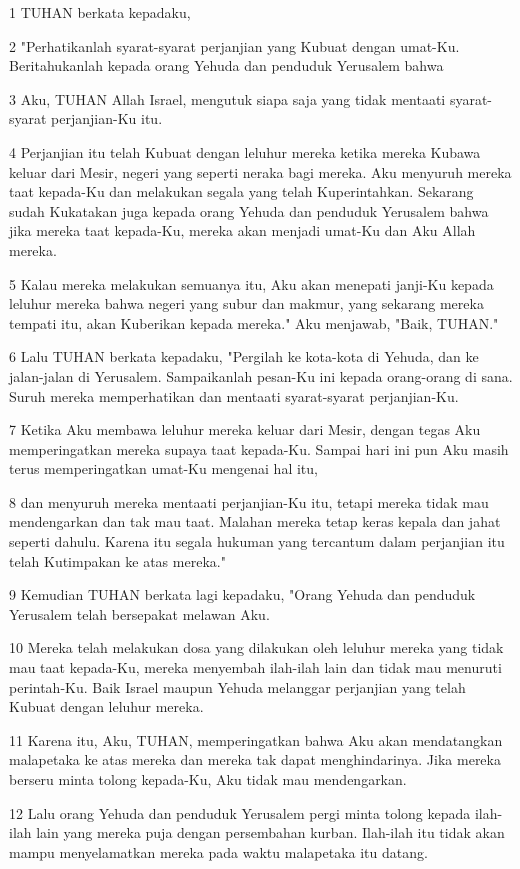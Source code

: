 \par 1 TUHAN berkata kepadaku,
\par 2 "Perhatikanlah syarat-syarat perjanjian yang Kubuat dengan umat-Ku. Beritahukanlah kepada orang Yehuda dan penduduk Yerusalem bahwa
\par 3 Aku, TUHAN Allah Israel, mengutuk siapa saja yang tidak mentaati syarat-syarat perjanjian-Ku itu.
\par 4 Perjanjian itu telah Kubuat dengan leluhur mereka ketika mereka Kubawa keluar dari Mesir, negeri yang seperti neraka bagi mereka. Aku menyuruh mereka taat kepada-Ku dan melakukan segala yang telah Kuperintahkan. Sekarang sudah Kukatakan juga kepada orang Yehuda dan penduduk Yerusalem bahwa jika mereka taat kepada-Ku, mereka akan menjadi umat-Ku dan Aku Allah mereka.
\par 5 Kalau mereka melakukan semuanya itu, Aku akan menepati janji-Ku kepada leluhur mereka bahwa negeri yang subur dan makmur, yang sekarang mereka tempati itu, akan Kuberikan kepada mereka." Aku menjawab, "Baik, TUHAN."
\par 6 Lalu TUHAN berkata kepadaku, "Pergilah ke kota-kota di Yehuda, dan ke jalan-jalan di Yerusalem. Sampaikanlah pesan-Ku ini kepada orang-orang di sana. Suruh mereka memperhatikan dan mentaati syarat-syarat perjanjian-Ku.
\par 7 Ketika Aku membawa leluhur mereka keluar dari Mesir, dengan tegas Aku memperingatkan mereka supaya taat kepada-Ku. Sampai hari ini pun Aku masih terus memperingatkan umat-Ku mengenai hal itu,
\par 8 dan menyuruh mereka mentaati perjanjian-Ku itu, tetapi mereka tidak mau mendengarkan dan tak mau taat. Malahan mereka tetap keras kepala dan jahat seperti dahulu. Karena itu segala hukuman yang tercantum dalam perjanjian itu telah Kutimpakan ke atas mereka."
\par 9 Kemudian TUHAN berkata lagi kepadaku, "Orang Yehuda dan penduduk Yerusalem telah bersepakat melawan Aku.
\par 10 Mereka telah melakukan dosa yang dilakukan oleh leluhur mereka yang tidak mau taat kepada-Ku, mereka menyembah ilah-ilah lain dan tidak mau menuruti perintah-Ku. Baik Israel maupun Yehuda melanggar perjanjian yang telah Kubuat dengan leluhur mereka.
\par 11 Karena itu, Aku, TUHAN, memperingatkan bahwa Aku akan mendatangkan malapetaka ke atas mereka dan mereka tak dapat menghindarinya. Jika mereka berseru minta tolong kepada-Ku, Aku tidak mau mendengarkan.
\par 12 Lalu orang Yehuda dan penduduk Yerusalem pergi minta tolong kepada ilah-ilah lain yang mereka puja dengan persembahan kurban. Ilah-ilah itu tidak akan mampu menyelamatkan mereka pada waktu malapetaka itu datang.
